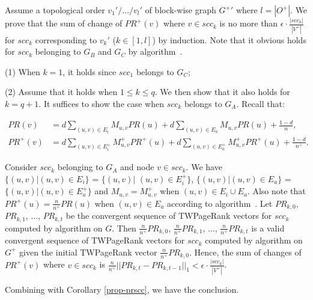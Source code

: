 \begin{proofS}
Assume a topological order $v_1'/\dots/v_{l}'$ of block-wise graph $G^+{'}$ where $l=|O^+|$. We prove that the sum of change of $PR^+(v)$ where $v\in scc_k$ is no more than $\epsilon\cdot\frac{|scc_k|}{|V^+|}$ for $scc_k$ corresponding to $v_k'$ ($k\in [1,l]$) by induction. Note that it obvious holds for $scc_k$ belonging to $G_B$ and $G_C$ by algorithm~\inctwprscc.

\noindent(1) When $k=1$, it holds since $scc_1$ belongs to $G_C$;

\noindent(2) Assume that it holds when $1\le k\le q$. We then show that it also holds for $k=q+1$. It suffices to show the case when $scc_k$ belongs to $G_A$. Recall that:
%
\begin{scriptsize}
\begin{equation*}
\begin{split}
PR(v) & =  d \sum_{(u,v)\in E_i} M_{u,v} PR(u) + d \sum_{(u,v)\in E_a} M_{u,v} PR(u) +  \frac{1-d}{n},\\
PR^+(v) & =  d \sum_{(u,v)\in E^+_i} M^+_{u,v} PR^+(u) + d \sum_{(u,v)\in E^+_a} M^+_{u,v} PR^+(u) +  \frac{1-d}{n^+}.
\end{split}
\end{equation*}
\end{scriptsize}
\noindent
Consider $scc_k$ belonging to $G_A$ and node $v\in scc_k$. We have $\{(u,v)|(u,v)\in E_i\}$ = $\{(u,v)|$ $(u,v)\in E^+_i\}$, $\{(u,v)|(u,v)\in E_a\}$ = $\{(u,v)|(u,v)\in E^+_a\}$ and $M_{u,v}=M^+_{u,v}$ when $(u,v)\in E_i\cup E_a$. Also note that $PR^+(u)=\frac{n}{n^+}PR(u)$ when $(u,v)\in E_a$ according to algorithm~\inctwprscc. Let $PR_{k,0}$, $PR_{k,1}$, $\dots$, $PR_{k,t}$ be the convergent sequence of TWPageRank vectors for $scc_k$ computed by algorithm \twprscc on $G$. Then $\frac{n}{n^+}PR_{k,0}$, $\frac{n}{n^+}PR_{k,1}$, $\dots$, $\frac{n}{n^+}PR_{k,t}$ is a valid convergent sequence of TWPageRank vectors for $scc_k$ computed by algorithm \inctwprscc on $G^+$ given the initial TWPageRank vector $\frac{n}{n^+}PR_{k,0}$.
Hence, the sum of changes of $PR^+(v)$ where $v\in scc_k$ is $\frac{n}{n^+}||PR_{k,t}-PR_{k,t-1}||_1 < \epsilon\cdot\frac{|scc_k|}{|V^+|}$.

Combining with Corollary \ref{prop-prscc}, we have the conclusion.
\end{proofS}


